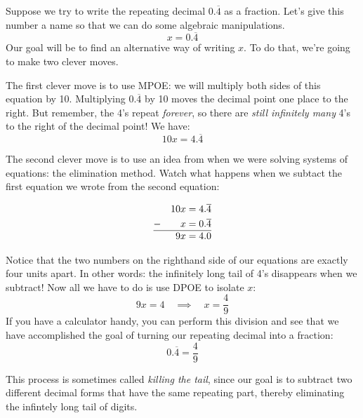 Suppose we try to write the repeating decimal $0.\overline{4}$ as a fraction. Let's give this number a name so that we can do some algebraic manipulations. \[x = 0.\overline{4}\] Our goal will be to find an alternative way of writing $x$. To do that, we're going to make two clever moves.

The first clever move is to use MPOE: we will multiply both sides of this equation by 10. Multiplying $0.\overline{4}$ by 10 moves the decimal point one place to the right. But remember, the 4's repeat \textit{forever}, so there are \textit{still infinitely many} 4's to the right of the decimal point! We have: \[10x = 4.\overline{4}\]

The second clever move is to use an idea from when we were solving systems of equations: the elimination method. Watch what happens when we subtact the first equation we wrote from the second equation:

\[\begin{aligned}
	&&	10x &= 4.\overline{4}\\
- 	&& 	x 	&= 0.\overline{4}\\\hline
	&&	9x 	&= 4.0
\end{aligned}\]

Notice that the two numbers on the righthand side of our equations are exactly four units apart. In other words: the infinitely long tail of 4's disappears when we subtract! Now all we have to do is use DPOE to isolate $x$: \[9x = 4 \quad\implies\quad x = \frac{4}{9}\] If you have a calculator handy, you can perform this division and see that we have accomplished the goal of turning our repeating decimal into a fraction:\[0.\overline{4} = \frac{4}{9}\]

This process is sometimes called \textit{killing the tail}, since our goal is to subtract two different decimal forms that have the same repeating part, thereby eliminating the infintely long tail of digits.

